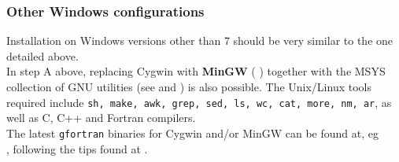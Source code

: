 \documentclass[12pt,twoside]{article}
\begin{document}
\subsubsection{Other Windows configurations}
\label{sec:windows_other}
Installation on Windows versions other than 7 should be very similar to the one detailed above.\\
In step A above, replacing Cygwin with {\bf MinGW} (%
%
) together with the MSYS collection of GNU utilities 
(see 
and
) is also possible.
The Unix/Linux tools required include {\tt sh, make, awk, grep, sed, ls, wc, cat, more, nm, ar},
as well as C, C++ and Fortran compilers.\\
The latest {\tt gfortran} binaries for Cygwin and/or MinGW can be found at, eg
\hfill \\
,
following the tips found at 
.
\end{document}
